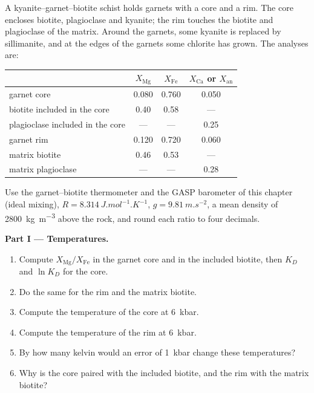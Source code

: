 \begin{problem}
\label{pb:b2:pt-paths:1}
A kyanite--garnet--biotite schist holds garnets with a core and a rim. The core encloses
biotite, plagioclase and kyanite; the rim touches the biotite and plagioclase of the
matrix. Around the garnets, some kyanite is replaced by sillimanite, and at the edges of
the garnets some chlorite has grown. The analyses are:
\begin{center}
\small
\begin{tabular}{@{}lccc@{}}
\hline
 & $X_{\text{Mg}}$ & $X_{\text{Fe}}$ & $X_{\text{Ca}}$ or $X_{\text{an}}$\\
\hline
garnet core & 0.080 & 0.760 & 0.050\\
biotite included in the core & 0.40 & 0.58 & ---\\
plagioclase included in the core & --- & --- & 0.25\\
garnet rim & 0.120 & 0.720 & 0.060\\
matrix biotite & 0.46 & 0.53 & ---\\
matrix plagioclase & --- & --- & 0.28\\
\hline
\end{tabular}
\end{center}
Use the garnet--biotite thermometer and the GASP barometer of this chapter (ideal mixing),
$R = \qty{8.314}{J.mol^{-1}.K^{-1}}$, $g = \qty{9.81}{m.s^{-2}}$, a mean density of
\qty{2800}{kg.m^{-3}} above the rock, and round each ratio to four decimals.

\noindent\textbf{Part I --- Temperatures.}
\begin{enumerate}
\item Compute $X_{\text{Mg}}/X_{\text{Fe}}$ in the garnet core and in the included
biotite, then $K_D$ and $\ln K_D$ for the core.
\item Do the same for the rim and the matrix biotite.
\item Compute the temperature of the core at \qty{6}{kbar}.
\item Compute the temperature of the rim at \qty{6}{kbar}.
\item By how many kelvin would an error of \qty{1}{kbar} change these temperatures?
\item Why is the core paired with the included biotite, and the rim with the matrix
biotite?
\end{enumerate}


\end{problem}
